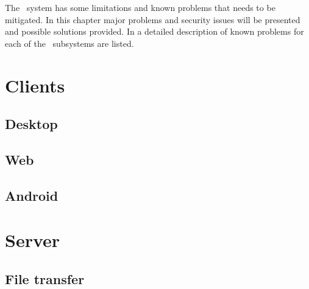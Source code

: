 The \appName\ system has some limitations and known problems that needs to be
mitigated. In this chapter major problems and security issues will be presented
and possible solutions provided. In  a detailed
description of known problems for each of the \appName\ subsystems are listed.

\section{Clients}
\subsection{Desktop}
\FloatBarrier
\subsection{Web}

\FloatBarrier
\subsection{Android}
\section{Server}
\subsection{File transfer}

